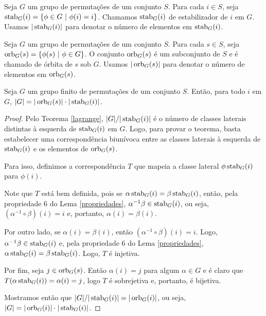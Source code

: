 	\begin{definition}[Estabilizador]
	\label{def estabilizador}
		Seja $G$ um grupo de permutações de um conjunto $S$. Para cada 
		$i\in S$, seja $\operatorname{stab}_G(i) = \{ \phi\in G \ | \ \phi(i) = i\}$. 
		Chamamos $\operatorname{stab}_G(i)$ de estabilizador de $i$ em $G$. Usamos
		$|\operatorname{stab}_G(i)|$ para denotar o número de elementos em $\operatorname{stab}_G(i)$.
	\end{definition}
	\begin{definition}[Órbita]
	\label{def orbita}
		Seja $G$ um grupo de permutações de um conjunto $S$. Para cada 
		$s\in S$, seja $\operatorname{orb}_G(s) = \{ \phi(s) \ | \ \phi\in G \}$. O conjunto
		$\operatorname{orb}_G(s)$ é um subconjunto de $S$ e é chamado de órbita de $s$ 
		sob $G$. Usamos $|\operatorname{orb}_G(s)|$ para denotar o número de elementos 
		em $\operatorname{orb}_G(s)$.
	\end{definition}
	\begin{theorem}
	\label{orb-stab}
		Seja $G$ um grupo finito de permutações de um conjunto $S$. 
		Então, para todo $i$ em $G$, $|G| = |\operatorname{orb}_G(s)|\cdot|\operatorname{stab}_G(i)|$.
	\end{theorem}
	\begin{proof}
		Pelo Teorema \ref{lagrange}, $|G|/|\operatorname{stab}_G(i)|$ é o número de
		classes laterais distintas à esquerda de $\operatorname{stab}_G(i)$ em $G$. 
		Logo, para provar o teorema, basta estabelecer uma correspondência
		biunívoca entre as classes laterais à esquerda de $\operatorname{stab}_G(i)$ e os
		elementos de $\operatorname{orb}_G(s)$.
		\par\vspace{0.3cm} Para isso, definimos a correspondência $T$ que
		mapeia a classe lateral $\phi\operatorname{stab}_G(i)$ para $\phi(i)$. 
		\par\vspace{0.3cm} Note que $T$ está bem definida, pois se 
		$\alpha\operatorname{stab}_G(i) = \beta\operatorname{stab}_G(i)$, então, pela propriedade 6 do 
		Lema \ref{propriedades}, $\alpha^{-1}\beta\in\operatorname{stab}_G(i)$, ou seja, 
		$(\alpha^{-1}\circ\beta)(i) = i$ e, portanto, $\alpha(i) = \beta(i)$.
		\par\vspace{0.3cm} Por outro lado, se $\alpha(i) = \beta(i)$, então 
		$(\alpha^{-1}\circ\beta)(i) = i$. Logo, 
		$\alpha^{-1}\beta\in\operatorname{stab}_G(i)$ e, pela propriedade 6 do 
		Lema \ref{propriedades}, $\alpha\operatorname{stab}_G(i) = \beta\operatorname{stab}_G(i)$. 
		Logo, $T$ é injetiva.
		\par\vspace{0.3cm} Por fim, seja $j\in\operatorname{orb}_G(s)$. Então 
		$\alpha(i) = j$ para algum $\alpha \in G$ e é claro que
		$T(\alpha\operatorname{stab}_G(i)) = \alpha(i) = j$, logo $T$ é sobrejetiva e,
		portanto, é bijetiva.
		\par\vspace{0.3cm} Mostramos então que 
		$|G|/|\operatorname{stab}_G(i)| = |\operatorname{orb}_G(i)|$, ou seja, 
		$|G| = |\operatorname{orb}_G(i)|\cdot|\operatorname{stab}_G(i)|$. 
	\end{proof}
